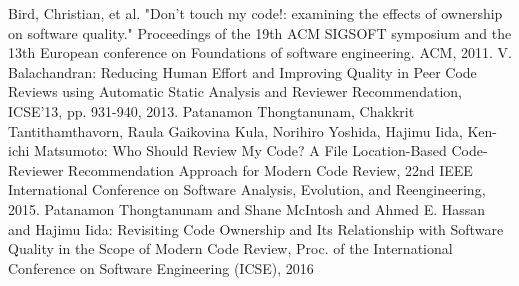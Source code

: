 \documentclass[submit,ses,noauthor]{ipsj} %
\begin{document}
\begin{thebibliography}{10}
Bird, Christian, et al. "Don't touch my code!: examining the effects of ownership on software quality." Proceedings of the 19th ACM SIGSOFT symposium and the 13th European conference on Foundations of software engineering. ACM, 2011.
V. Balachandran: Reducing Human Effort and Improving Quality in Peer Code Reviews using Automatic Static Analysis and Reviewer Recommendation, ICSE'13, pp. 931-940, 2013.
Patanamon Thongtanunam, Chakkrit Tantithamthavorn, Raula Gaikovina Kula, Norihiro Yoshida, Hajimu Iida, Ken-ichi Matsumoto: Who Should Review My Code? A File Location-Based Code-Reviewer Recommendation Approach for Modern Code Review, 22nd IEEE International Conference on Software Analysis, Evolution, and Reengineering, 2015.
Patanamon Thongtanunam and Shane McIntosh and Ahmed E. Hassan and Hajimu Iida: Revisiting Code Ownership and Its Relationship with Software Quality in the Scope of Modern Code Review, Proc. of the International Conference on Software Engineering (ICSE), 2016
 \end{thebibliography}
\end{document}
